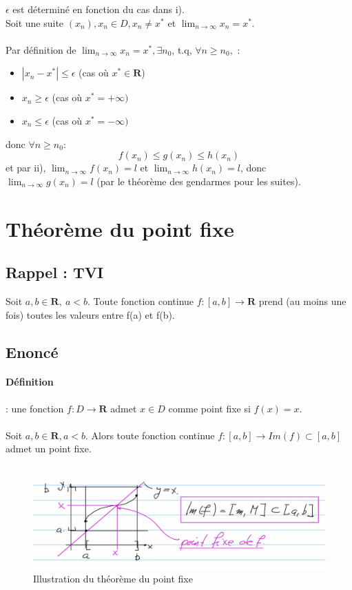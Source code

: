 \documentclass{article}
\begin{document}
$ \epsilon $ est déterminé en fonction du cas dans i).\\
Soit une suite $ (x_n), x_n \in D, x_n \neq x^* $ et $ \lim_{n\to\infty} x_n = x^* $.\\\\
Par définition de $ \lim_{n\to\infty} x_n = x^*, \exists n_0 $, t.q, $ \forall n \geq n_0, $ :
\begin{itemize}
    \item $ |x_n - x^*| \leq \epsilon $ (cas où $ x^* \in \mathbf{R} $)
    \item $ x_n \geq \epsilon $ (cas où $ x^* = +\infty)$
    \item $ x_n \leq \epsilon $ (cas où $ x^* = -\infty)$
\end{itemize}
donc $ \forall n \geq n_0 $:
\[ f(x_n) \leq g(x_n) \leq h(x_n) \]
et par ii), $ \lim_{n\to\infty} f(x_n) = l $ et $ \lim_{n\to\infty} h(x_n) = l $, donc $ \lim_{n\to\infty} g(x_n) = l $ (par le théorème des gendarmes pour les suites).

\newpage

\section{Théorème du point fixe}

\subsection{Rappel : TVI}

Soit $ a, b \in \mathbf{R},\ a < b $. Toute fonction continue $ f : [a, b] \to \mathbf{R} $ prend (au moins une fois) toutes les valeurs entre f(a) et f(b).

\subsection{Enoncé}

\paragraph{Définition} : une fonction $ f : D \to \mathbf{R} $ admet $ x \in D $ comme point fixe si $ f(x) = x $.\\\\
Soit $ a, b \in \mathbf{R}, a < b $. Alors toute fonction continue $ f : [a, b] \to Im(f) \subset [a, b] $ admet un point fixe.\\\\

\begin{figure}[htp]
    \centering
    \includegraphics[width=12cm]{Images/pointfixe.png}
    \caption{Illustration du théorème du point fixe}
    \label{fig:complex}
\end{figure} 
\end{document}
